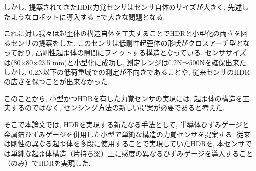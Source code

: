 しかし, 提案されてきたHDR力覚センサはセンサ自体のサイズが大きく, 
先述したようなロボットに導入する上で大きな問題となる.

これに対し我々は起歪体の構造自体を工夫することでHDRと小型化の両立を図るセンサ\cite{Ryuya}の提案をした. 
このセンサは低剛性起歪体の形状がクロスアーチ型となっており, 
高剛性起歪体の隙間にフィットする構造となっている. 
センササイズは(80×80×23.5 mm)と小型化に成功し, 
測定レンジは0.2N～500Nを確保出来た.
しかし, 0.2N以下の低荷重域での測定が不向きであることや, 
従来センサのHDRの広さを保つことが出来なかった. 

このことから, 小型かつHDRを有した力覚センサの実現には, 
起歪体の構造を工夫するのではなく, 
センシング方法の新しい提案が必要であると考えた. 

そこで本論文では, HDRを実現する新たなる手法として, 半導体ひずみゲージと
金属箔ひずみゲージを併用した小型で単純な構造の力覚センサを提案する. 
従来は剛性の異なる起歪体を多段に使用することで実現していたHDRを, 
本センサでは単純な起歪体構造（片持ち梁）上に感度の異なるひずみゲージを導入すること（のみ）でHDRを実現した. 

